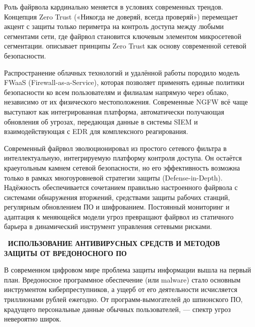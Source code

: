 \documentclass{SibFU-docs}
\begin{document}
\vspace{1em}


Роль файрвола кардинально меняется в условиях современных трендов. Концепция Zero Trust («Никогда не доверяй, всегда проверяй») перемещает акцент с защиты только периметра на контроль доступа между любыми сегментами сети, где файрвол становится ключевым элементом микросетевой сегментации. \cite{kindervag2010zerotrust} описывает принципы Zero Trust как основу современной сетевой безопасности.

Распространение облачных технологий и удалённой работы породило модель FWaaS (Firewall-as-a-Service), которая позволяет применять единые политики безопасности ко всем пользователям и филиалам напрямую через облако, независимо от их физического местоположения. Современные NGFW всё чаще выступают как интегрированная платформа, автоматически получающая обновления об угрозах, передающая данные в системы SIEM и взаимодействующая с EDR для комплексного реагирования.

Современный файрвол эволюционировал из простого сетевого фильтра в интеллектуальную, интегрируемую платформу контроля доступа. Он остаётся краеугольным камнем сетевой безопасности, но его эффективность возможна только в рамках многоуровневой стратегии защиты (Defense-in-Depth). Надёжность обеспечивается сочетанием правильно настроенного файрвола с системами обнаружения вторжений, средствами защиты рабочих станций, регулярным обновлением ПО и шифрованием. Постоянный мониторинг и адаптация к меняющейся модели угроз превращают файрвол из статичного барьера в динамический инструмент управления сетевыми рисками.

\newpage
{}
\begin{center}\textbf{\thesection\ ИСПОЛЬЗОВАНИЕ АНТИВИРУСНЫХ СРЕДСТВ И МЕТОДОВ ЗАЩИТЫ ОТ ВРЕДОНОСНОГО ПО}\end{center}
\vspace*{-1.5em}

В современном цифровом мире проблема защиты информации вышла на первый план. Вредоносное программное обеспечение (или malware) стало основным инструментом киберпреступников, а ущерб от его деятельности исчисляется триллионами рублей ежегодно. От программ-вымогателей до шпионского ПО, крадущего персональные данные обычных пользователей, --- спектр угроз невероятно широк.
\end{document}
